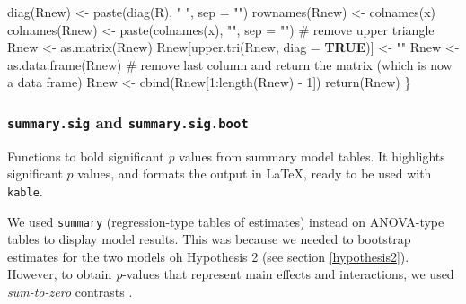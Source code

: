 \documentclass[
  bookmarksnumbered]{article}
\newenvironment{Shaded}{\begin{snugshade}}{\end{snugshade}}
\newcommand{\AttributeTok}[1]{\textcolor[rgb]{0.80,0.80,0.80}{#1}}
\newcommand{\CommentTok}[1]{\textcolor[rgb]{0.50,0.62,0.50}{#1}}
\newcommand{\ConstantTok}[1]{\textcolor[rgb]{0.86,0.64,0.64}{\textbf{#1}}}
\newcommand{\DecValTok}[1]{\textcolor[rgb]{0.86,0.86,0.80}{#1}}
\newcommand{\FunctionTok}[1]{\textcolor[rgb]{0.94,0.94,0.56}{#1}}
\newcommand{\NormalTok}[1]{\textcolor[rgb]{0.80,0.80,0.80}{#1}}
\newcommand{\OtherTok}[1]{\textcolor[rgb]{0.94,0.94,0.56}{#1}}
\newcommand{\SpecialCharTok}[1]{\textcolor[rgb]{0.86,0.64,0.64}{#1}}
\newcommand{\StringTok}[1]{\textcolor[rgb]{0.80,0.58,0.58}{#1}}
\begin{document}
\begin{Shaded}
\begin{Highlighting}[]
  \FunctionTok{diag}\NormalTok{(Rnew) }\OtherTok{\textless{}{-}} \FunctionTok{paste}\NormalTok{(}\FunctionTok{diag}\NormalTok{(R), }\StringTok{" "}\NormalTok{, }
                      \AttributeTok{sep =} \StringTok{""}\NormalTok{)}
  \FunctionTok{rownames}\NormalTok{(Rnew) }\OtherTok{\textless{}{-}} \FunctionTok{colnames}\NormalTok{(x)}
  \FunctionTok{colnames}\NormalTok{(Rnew) }\OtherTok{\textless{}{-}} \FunctionTok{paste}\NormalTok{(}\FunctionTok{colnames}\NormalTok{(x), }\StringTok{""}\NormalTok{, }
                          \AttributeTok{sep =} \StringTok{""}\NormalTok{)}
  \CommentTok{\# remove upper triangle}
\NormalTok{  Rnew }\OtherTok{\textless{}{-}} \FunctionTok{as.matrix}\NormalTok{(Rnew)}
\NormalTok{  Rnew[}\FunctionTok{upper.tri}\NormalTok{(Rnew, }\AttributeTok{diag =} \ConstantTok{TRUE}\NormalTok{)] }\OtherTok{\textless{}{-}} \StringTok{""}
\NormalTok{  Rnew }\OtherTok{\textless{}{-}} \FunctionTok{as.data.frame}\NormalTok{(Rnew)}
  \CommentTok{\# remove last column and return the matrix (which is now a data frame)}
\NormalTok{  Rnew }\OtherTok{\textless{}{-}} \FunctionTok{cbind}\NormalTok{(Rnew[}\DecValTok{1}\SpecialCharTok{:}\FunctionTok{length}\NormalTok{(Rnew) }\SpecialCharTok{{-}} \DecValTok{1}\NormalTok{])}
  \FunctionTok{return}\NormalTok{(Rnew)}
\NormalTok{\}}
\end{Highlighting}
\end{Shaded}

\subsubsection{\texorpdfstring{\texttt{summary.sig} and \texttt{summary.sig.boot}}{summary.sig and summary.sig.boot}}\label{summary.sig-and-summary.sig.boot}

Functions to bold significant \emph{p} values from summary model tables. It highlights significant \(p\) values, and formats the output in \LaTeX, ready to be used with \texttt{kable}.

We used \texttt{summary} (regression-type tables of estimates) instead on ANOVA-type tables to display model results. This was because we needed to bootstrap estimates for the two models oh Hypothesis 2 (see section \ref{hypothesis2}). However, to obtain \emph{p}-values that represent main effects and interactions, we used \emph{sum-to-zero} contrasts \autocites[see e.g.,][]{kaufmanContrastCodingLeast1974,keppelDataAnalysisResearch1989}.
\end{document}
